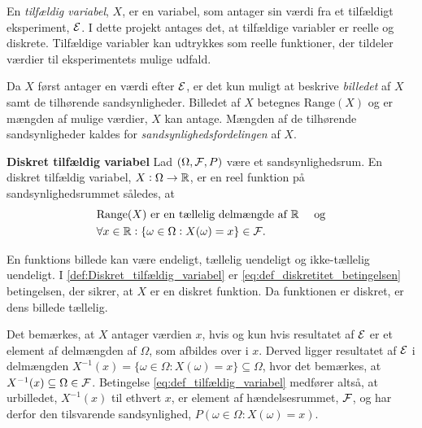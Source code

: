 En \textit{tilfældig variabel}, $X$, er en variabel, som antager sin værdi fra et tilfældigt eksperiment, $\mathcal{E}$. I dette projekt antages det, at tilfældige variabler er reelle og diskrete. 
Tilfældige variabler kan udtrykkes som reelle funktioner, der tildeler værdier til eksperimentets mulige udfald.


Da $X$ først antager en værdi efter $\mathcal{E}$, er det kun muligt at beskrive \textit{billedet} af $X$ samt de tilhørende sandsynligheder. Billedet af $X$ betegnes $\text{Range}(X)$ og er mængden af mulige værdier, $X$ kan antage. Mængden af de tilhørende sandsynligheder kaldes for \textit{sandsynlighedsfordelingen} af $X$.


\begin{minipage}\textwidth
\begin{defn}\label{def:Diskret_tilfældig_variabel}\textbf{Diskret tilfældig variabel} %
\newline
Lad $(\Omega, \mathcal{F}, P)$ være et sandsynlighedsrum. En diskret tilfældig variabel, $X:\Omega \to \mathbb{R}$, er en reel funktion på sandsynlighedsrummet således, at
%
\begin{align}
    &\text{$\text{Range}(X)$ er en tællelig delmængde af $\R$ } \quad \text{og}\label{eq:def_diskretitet_betingelsen}\\
    &\forall x\in \R: \{\omega\in \Omega: X(\omega)=x\}\in %
    \F. \label{eq:def_tilfældig_variabel}
\end{align}

\end{defn}
\end{minipage}

En funktions billede kan være endeligt, tællelig uendeligt og ikke-tællelig uendeligt. I \autoref{def:Diskret_tilfældig_variabel} er \eqref{eq:def_diskretitet_betingelsen} betingelsen, der sikrer, at $X$ er en diskret funktion. Da funktionen er diskret, er dens billede tællelig.

Det bemærkes, at $X$ antager værdien $x$, hvis og kun hvis resultatet af $\mathcal{E}$ er et element af delmængden af $\Omega$, som afbildes over i $x$. Derved ligger resultatet af $\mathcal{E}$ i delmængden $X^{-1}(x) = \{\omega\in \Omega: X(\omega)=x\} \subseteq \Omega$, hvor det bemærkes, at  $X^{-1}(x)\subseteq \Omega \in \mathcal{F}$.
Betingelse \eqref{eq:def_tilfældig_variabel} medfører altså, at urbilledet, $X^{-1}(x)$ til ethvert $x$, er element af hændelsesrummet, $\mathcal{F}$, og har derfor den tilsvarende sandsynlighed, $P(\omega\in \Omega: X(\omega)=x)$.

